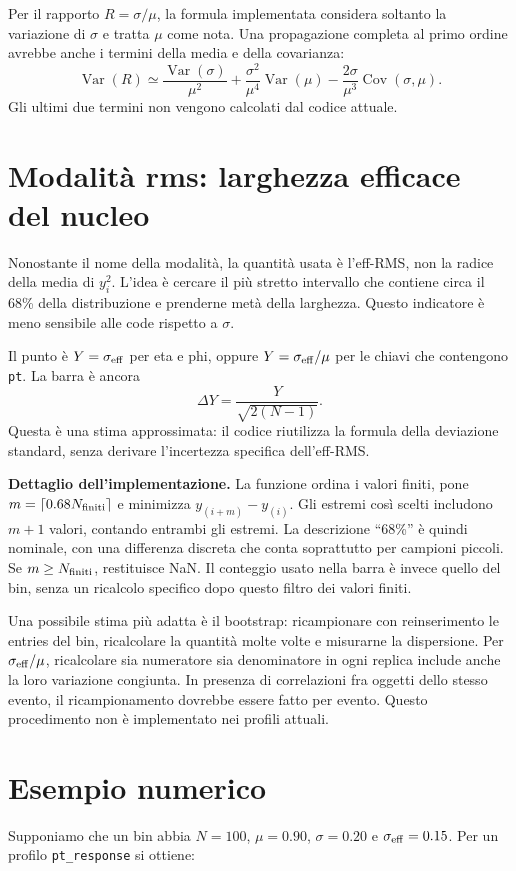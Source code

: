 \documentclass[11pt,a4paper]{article}
\begin{document}
Per il rapporto $R=\sigma/\mu$, la formula implementata considera soltanto la variazione di $\sigma$ e tratta $\mu$ come nota. Una propagazione completa al primo ordine avrebbe anche i termini della media e della covarianza:
\[
\operatorname{Var}(R)\simeq
\frac{\operatorname{Var}(\sigma)}{\mu^2}
+\frac{\sigma^2}{\mu^4}\operatorname{Var}(\mu)
-\frac{2\sigma}{\mu^3}\operatorname{Cov}(\sigma,\mu).
\]
Gli ultimi due termini non vengono calcolati dal codice attuale.

\section{Modalità rms: larghezza efficace del nucleo}
Nonostante il nome della modalità, la quantità usata è l'eff-RMS, non la radice della media di $y_i^2$. L'idea è cercare il più stretto intervallo che contiene circa il 68\% della distribuzione e prenderne metà della larghezza. Questo indicatore è meno sensibile alle code rispetto a $\sigma$.

Il punto è $Y=\sigma_{\rm eff}$ per eta e phi, oppure $Y=\sigma_{\rm eff}/\mu$ per le chiavi che contengono \texttt{pt}. La barra è ancora
\[
\boxed{\Delta Y=\frac{Y}{\sqrt{2(N-1)}}}.
\]
Questa è una stima approssimata: il codice riutilizza la formula della deviazione standard, senza derivare l'incertezza specifica dell'eff-RMS.

\textbf{Dettaglio dell'implementazione.} La funzione ordina i valori finiti, pone $m=\lceil0.68N_{\rm finiti}\rceil$ e minimizza $y_{(i+m)}-y_{(i)}$. Gli estremi così scelti includono $m+1$ valori, contando entrambi gli estremi. La descrizione ``68\%'' è quindi nominale, con una differenza discreta che conta soprattutto per campioni piccoli. Se $m\geq N_{\rm finiti}$, restituisce NaN. Il conteggio usato nella barra è invece quello del bin, senza un ricalcolo specifico dopo questo filtro dei valori finiti.

Una possibile stima più adatta è il bootstrap: ricampionare con reinserimento le entries del bin, ricalcolare la quantità molte volte e misurarne la dispersione. Per $\sigma_{\rm eff}/\mu$, ricalcolare sia numeratore sia denominatore in ogni replica include anche la loro variazione congiunta. In presenza di correlazioni fra oggetti dello stesso evento, il ricampionamento dovrebbe essere fatto per evento. Questo procedimento non è implementato nei profili attuali.

\section{Esempio numerico}
Supponiamo che un bin abbia $N=100$, $\mu=0.90$, $\sigma=0.20$ e $\sigma_{\rm eff}=0.15$. Per un profilo \texttt{pt\_response} si ottiene:
\end{document}
